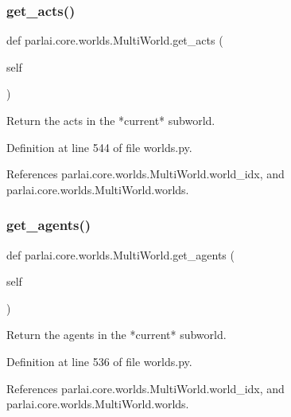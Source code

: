 \subsubsection{\texorpdfstring{get\+\_\+acts()}{get\_acts()}}
{\footnotesize\ttfamily def parlai.\+core.\+worlds.\+Multi\+World.\+get\+\_\+acts (\begin{DoxyParamCaption}\item[{}]{self }\end{DoxyParamCaption})}

\begin{DoxyVerb}Return the acts in the *current* subworld.\end{DoxyVerb}
 

Definition at line 544 of file worlds.\+py.



References parlai.\+core.\+worlds.\+Multi\+World.\+world\+\_\+idx, and parlai.\+core.\+worlds.\+Multi\+World.\+worlds.

\mbox{\label{classparlai_1_1core_1_1worlds_1_1MultiWorld_a6e012b3db760d95f189baf3466fc55d0}} 
\subsubsection{\texorpdfstring{get\+\_\+agents()}{get\_agents()}}
{\footnotesize\ttfamily def parlai.\+core.\+worlds.\+Multi\+World.\+get\+\_\+agents (\begin{DoxyParamCaption}\item[{}]{self }\end{DoxyParamCaption})}

\begin{DoxyVerb}Return the agents in the *current* subworld.\end{DoxyVerb}
 

Definition at line 536 of file worlds.\+py.



References parlai.\+core.\+worlds.\+Multi\+World.\+world\+\_\+idx, and parlai.\+core.\+worlds.\+Multi\+World.\+worlds.

\mbox{\label{classparlai_1_1core_1_1worlds_1_1MultiWorld_a593c1eb833633014c2506abd80695317}} 
